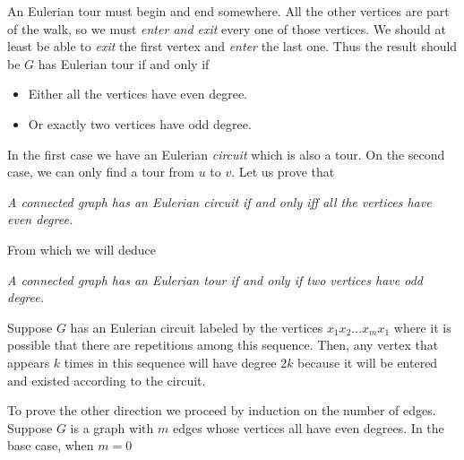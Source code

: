 \documentclass[12pt]{memoir}
\begin{document}
\begin{ptcbr}
    An Eulerian tour must begin and end somewhere. All the other vertices are part of the walk, so we must \emph{enter and exit} every one of those vertices. We should at least be able to \emph{exit} the first vertex and \emph{enter} the last one. Thus the result should be $G$ has Eulerian tour if and only if
    \begin{itemize}
        \itemsep=-0.4em
        \item Either all the vertices have even degree.
        \item Or exactly two vertices have odd degree. 
    \end{itemize}
    In the first case we have an Eulerian \emph{circuit} which is also a tour. On the second case, we can only find a tour from $u$ to $v$.
    Let us prove that 
\begin{center}
    \emph{A connected graph has an Eulerian circuit if and only iff all the vertices have even degree.}
\end{center}
From which we will deduce
\begin{center}
    \emph{A connected graph has an Eulerian tour if and only if two vertices have odd degree.}
\end{center}
Suppose $G$ has an Eulerian circuit labeled by the vertices $x_{1}x_{2}\dots x_mx_1$ where it is possible that there are repetitions among this sequence. Then, any vertex that appears $k$ times in this sequence will have degree $2k$ because it will be entered and existed according to the circuit.\par 
To prove the other direction we proceed by induction on the number of edges. Suppose $G$ is a graph with $m$ edges whose vertices all have even degrees. In the base case, when $m=0$
\end{ptcbr}
\end{document}
